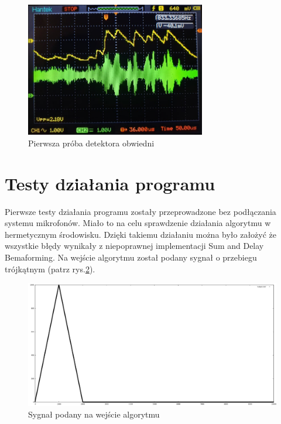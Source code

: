\documentclass[eng,printmode]{mgr}
\begin{document}
\begin{figure}[ht]

    \centering

  \includegraphics[width=0.7\textwidth, angle=0]{obwiednia_syg1.png}

    \caption{Pierwsza próba detektora obwiedni}
 \label{fig-przebieg1}
    

\end{figure}





\section{Testy działania programu}
Pierwsze testy działania programu zostały przeprowadzone bez podłączania systemu mikrofonów. Miało to na celu sprawdzenie działania algorytmu w hermetycznym środowisku. Dzięki takiemu działaniu można było założyć że wszystkie błędy wynikały z niepoprawnej implementacji Sum and Delay Bemaforming.
Na wejście algorytmu został podany sygnał o przebiegu trójkątnym (patrz rys.\ref{fig-sygnal}).
\begin{figure}[!ht]

    \centering

  \includegraphics[width=1\textwidth, angle=0]{sygnal.png}

    \caption{Sygnał podany na wejście algorytmu}
 \label{fig-sygnal}
    

\end{figure}
\end{document}
